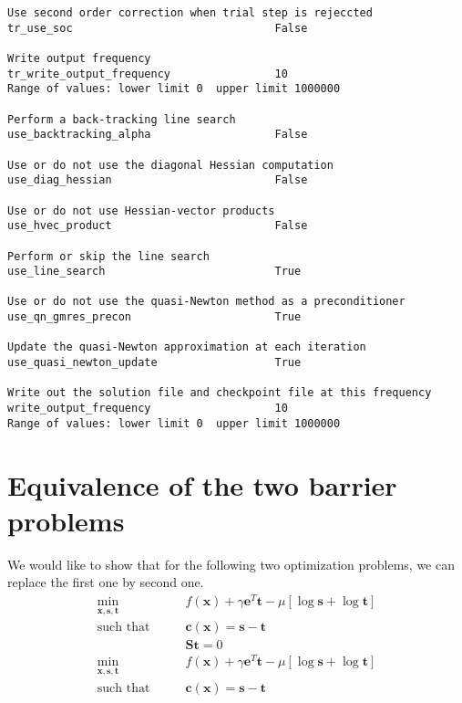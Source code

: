 \documentclass[12pt]{article}
\newcommand{\mb}{\mathbf}
\begin{document}
{\begin{verbatim}
Use second order correction when trial step is rejeccted
tr_use_soc                               False

Write output frequency
tr_write_output_frequency                10
Range of values: lower limit 0  upper limit 1000000

Perform a back-tracking line search
use_backtracking_alpha                   False

Use or do not use the diagonal Hessian computation
use_diag_hessian                         False

Use or do not use Hessian-vector products
use_hvec_product                         False

Perform or skip the line search
use_line_search                          True

Use or do not use the quasi-Newton method as a preconditioner
use_qn_gmres_precon                      True

Update the quasi-Newton approximation at each iteration
use_quasi_newton_update                  True

Write out the solution file and checkpoint file at this frequency
write_output_frequency                   10
Range of values: lower limit 0  upper limit 1000000
\end{verbatim}}





\appendix
\section{Equivalence of the two barrier problems}
\label{section:proof}
We would like to show that for the following two optimization problems, we can replace the first one by second one.
%
\begin{equation}
  \label{eqn:barrier-1}
  \begin{aligned}
    \min_{\mb{x}, \mb{s}, \mb{t}} \qquad & f(\mb{x}) + \gamma \mb{e}^T \mb{t} - \mu [\log \mb{s} + \log \mb{t} ] \\
    \text{such that} \qquad
    & \mb{c}(\mb{x}) = \mb{s} - \mb{t} \\
    & \mb{S} \mb{t} = 0
  \end{aligned}
\end{equation}
%
\begin{equation}
  \label{eqn:barrier-2}
  \begin{aligned}
    \min_{\mb{x}, \mb{s}, \mb{t}} \qquad & f(\mb{x}) + \gamma \mb{e}^T \mb{t} - \mu [\log \mb{s} + \log \mb{t} ] \\
    \text{such that} \qquad
    & \mb{c}(\mb{x}) = \mb{s} - \mb{t}
  \end{aligned}
\end{equation}
\end{document}
